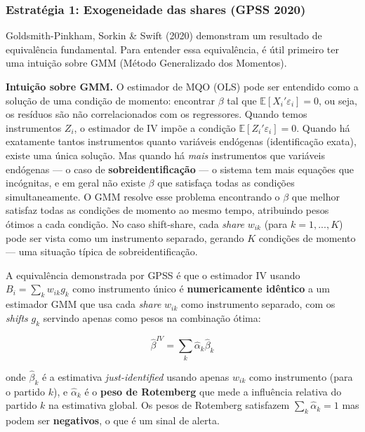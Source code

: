 \documentclass[
]{article}
\begin{document}
\subsubsection{Estratégia 1: Exogeneidade das shares (GPSS 2020)}\label{estratuxe9gia-1-exogeneidade-das-shares-gpss-2020}

Goldsmith-Pinkham, Sorkin \& Swift (2020) demonstram um resultado de equivalência fundamental. Para entender essa equivalência, é útil primeiro ter uma intuição sobre GMM (Método Generalizado dos Momentos).

\textbf{Intuição sobre GMM.} O estimador de MQO (OLS) pode ser entendido como a solução de uma condição de momento: encontrar \(\beta\) tal que \(\mathbb{E}[X_i' \varepsilon_i] = 0\), ou seja, os resíduos são não correlacionados com os regressores. Quando temos instrumentos \(Z_i\), o estimador de IV impõe a condição \(\mathbb{E}[Z_i' \varepsilon_i] = 0\). Quando há exatamente tantos instrumentos quanto variáveis endógenas (identificação exata), existe uma única solução. Mas quando há \emph{mais} instrumentos que variáveis endógenas --- o caso de \textbf{sobreidentificação} --- o sistema tem mais equações que incógnitas, e em geral não existe \(\beta\) que satisfaça todas as condições simultaneamente. O GMM resolve esse problema encontrando o \(\beta\) que melhor satisfaz todas as condições de momento ao mesmo tempo, atribuindo pesos ótimos a cada condição. No caso shift-share, cada \emph{share} \(w_{ik}\) (para \(k = 1, ..., K\)) pode ser vista como um instrumento separado, gerando \(K\) condições de momento --- uma situação típica de sobreidentificação.

A equivalência demonstrada por GPSS é que o estimador IV usando \(B_i = \sum_k w_{ik} g_k\) como instrumento único é \textbf{numericamente idêntico} a um estimador GMM que usa cada \emph{share} \(w_{ik}\) como instrumento separado, com os \emph{shifts} \(g_k\) servindo apenas como pesos na combinação ótima:

\begin{equation}
\hat{\beta}^{IV} = \sum_k \hat{\alpha}_k \hat{\beta}_k
\label{eq:gpss-equiv}
\end{equation}

onde \(\hat{\beta}_k\) é a estimativa \emph{just-identified} usando apenas \(w_{ik}\) como instrumento (para o partido \(k\)), e \(\hat{\alpha}_k\) é o \textbf{peso de Rotemberg} que mede a influência relativa do partido \(k\) na estimativa global. Os pesos de Rotemberg satisfazem \(\sum_k \hat{\alpha}_k = 1\) mas podem ser \textbf{negativos}, o que é um sinal de alerta.
\end{document}
